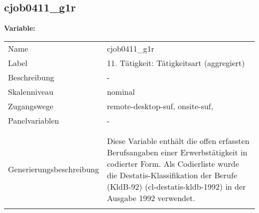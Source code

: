 	
	
	\subsection{cjob0411\_g1r}
	\label{subSection:cjob0411_g1r}

	\noindent\textbf{Variable:}\\
		\begin{tabular}{lL{11.3cm}}
			\label{tableVariable:cjob0411_g1r}
			Name & cjob0411\_g1r \\
			Label & 11. Tätigkeit: Tätigkeitsart (aggregiert) \\
			Beschreibung & - \\
			Skalenniveau & nominal \\
			Zugangswege &
				remote-desktop-suf,
				onsite-suf,
 \\
			Panelvariablen & -
			 \\
			 \\
 \\
					Generierungsbeschreibung & Diese Variable enthält die offen erfassten Berufsangaben einer Erwerbstätigkeit in codierter Form. Als Codierliste wurde die Destatis-Klassifikation der Berufe (KldB-92) (cl-destatis-kldb-1992) in der Ausgabe 1992 verwendet. 
				 \\	
			 \\
		\end{tabular}






